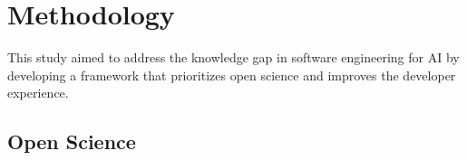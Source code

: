 


\section{Methodology}




This study aimed to address the knowledge gap in software engineering for AI by developing a framework that prioritizes open science and improves the developer experience. 

\subsection{Open Science}

